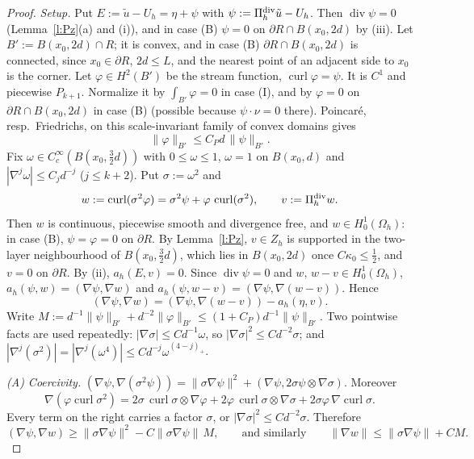 \documentclass[11pt,reqno]{amsart}
\theoremstyle{plain}
\theoremstyle{definition}
\newcommand{\Oh}{\Omega_h}
\newcommand{\Zh}{Z_h}
\newcommand{\ut}{\tilde u}
\newcommand{\norm}[1]{\lVert #1\rVert}
\newcommand{\curl}{\operatorname{curl}}
\renewcommand{\div}{\operatorname{div}}
\newcommand{\Pz}{\Pi^{\rm div}_h}   %
\begin{document}
\begin{proof}
\emph{Setup.} Put $E:=\ut-U_h=\eta+\psi$ with $\psi:=\Pz\ut-U_h$. Then $\div\psi=0$ (Lemma~\ref{l:Pz}(a) and (i)), and in case (B) $\psi=0$ on $\partial R\cap B(x_0,2d)$ by (iii). Let $B':=B(x_0,2d)\cap R$; it is convex, and in case (B) $\partial R\cap B(x_0,2d)$ is connected, since $x_0\in\partial R$, $2d\le L$, and the nearest point of an adjacent side to $x_0$ is the corner. Let $\varphi\in H^2(B')$ be the stream function, $\curl\varphi=\psi$. It is $C^1$ and piecewise $P_{k+1}$. Normalize it by $\int_{B'}\varphi=0$ in case (I), and by $\varphi=0$ on $\partial R\cap B(x_0,2d)$ in case (B) (possible because $\psi\cdot\nu=0$ there). Poincar\'e, resp.\ Friedrichs, on this scale-invariant family of convex domains gives
\begin{equation}\label{e:P}
\norm\varphi_{B'}\le C_Pd\,\norm\psi_{B'} .
\end{equation}
Fix $\omega\in C^\infty_c(B(x_0,\frac32d))$ with $0\le\omega\le1$, $\omega=1$ on $B(x_0,d)$ and $|\nabla^j\omega|\le C_jd^{-j}$ ($j\le k+2$). Put $\sigma:=\omega^2$ and
\[
w:=\curl(\sigma^2\varphi)=\sigma^2\psi+\varphi\,\curl(\sigma^2),\qquad v:=\Pz w .
\]
Then $w$ is continuous, piecewise smooth and divergence free, and $w\in H^1_0(\Oh)$: in case (B), $\psi=\varphi=0$ on $\partial R$. By Lemma~\ref{l:Pz}, $v\in\Zh$ is supported in the two-layer neighbourhood of $B(x_0,\frac32d)$, which lies in $B(x_0,2d)$ once $C\kappa_0\le\frac12$, and $v=0$ on $\partial R$. By (ii), $a_h(E,v)=0$. Since $\div\psi=0$ and $w,\,w-v\in H^1_0(\Oh)$, $a_h(\psi,w)=(\nabla\psi,\nabla w)$ and $a_h(\psi,w-v)=(\nabla\psi,\nabla(w-v))$. Hence
\begin{equation}\label{e:main}
(\nabla\psi,\nabla w)=(\nabla\psi,\nabla(w-v))-a_h(\eta,v).
\end{equation}
Write $M:=d^{-1}\norm\psi_{B'}+d^{-2}\norm\varphi_{B'}\le(1+C_P)d^{-1}\norm\psi_{B'}$. Two pointwise facts are used repeatedly: $|\nabla\sigma|\le Cd^{-1}\omega$, so $|\nabla\sigma|^2\le Cd^{-2}\sigma$; and $|\nabla^j(\sigma^2)|=|\nabla^j(\omega^4)|\le Cd^{-j}\omega^{(4-j)_+}$.

\emph{(A) Coercivity.} $(\nabla\psi,\nabla(\sigma^2\psi))=\norm{\sigma\nabla\psi}^2+(\nabla\psi,2\sigma\psi\otimes\nabla\sigma)$. Moreover
\[
\nabla(\varphi\curl\sigma^2)=2\sigma\,\curl\sigma\otimes\nabla\varphi+2\varphi\,\curl\sigma\otimes\nabla\sigma+2\sigma\varphi\,\nabla\curl\sigma .
\]
Every term on the right carries a factor $\sigma$, or $|\nabla\sigma|^2\le Cd^{-2}\sigma$. Therefore
\[
(\nabla\psi,\nabla w)\ge\norm{\sigma\nabla\psi}^2-C\norm{\sigma\nabla\psi}\,M,\qquad\text{and similarly}\qquad \norm{\nabla w}\le\norm{\sigma\nabla\psi}+CM .
\]


\end{proof}
\end{document}
